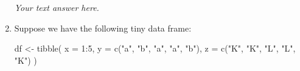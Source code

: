 \documentclass[
  letterpaper,
  DIV=11,
  numbers=noendperiod]{scrreprt}
\newenvironment{Shaded}{\begin{snugshade}}{\end{snugshade}}
\newcommand{\AttributeTok}[1]{\textcolor[rgb]{0.40,0.45,0.13}{#1}}
\newcommand{\DecValTok}[1]{\textcolor[rgb]{0.68,0.00,0.00}{#1}}
\newcommand{\FunctionTok}[1]{\textcolor[rgb]{0.28,0.35,0.67}{#1}}
\newcommand{\NormalTok}[1]{\textcolor[rgb]{0.00,0.23,0.31}{#1}}
\newcommand{\OtherTok}[1]{\textcolor[rgb]{0.00,0.23,0.31}{#1}}
\newcommand{\SpecialCharTok}[1]{\textcolor[rgb]{0.37,0.37,0.37}{#1}}
\newcommand{\StringTok}[1]{\textcolor[rgb]{0.13,0.47,0.30}{#1}}
\begin{document}
\begin{enumerate}
\begin{tcolorbox}
  \emph{Your text answer here.}

  \end{tcolorbox}
\item
  Suppose we have the following tiny data frame:

\begin{Shaded}
\begin{Highlighting}[]
\NormalTok{df }\OtherTok{\textless{}{-}} \FunctionTok{tibble}\NormalTok{(}
  \AttributeTok{x =} \DecValTok{1}\SpecialCharTok{:}\DecValTok{5}\NormalTok{,}
  \AttributeTok{y =} \FunctionTok{c}\NormalTok{(}\StringTok{"a"}\NormalTok{, }\StringTok{"b"}\NormalTok{, }\StringTok{"a"}\NormalTok{, }\StringTok{"a"}\NormalTok{, }\StringTok{"b"}\NormalTok{),}
  \AttributeTok{z =} \FunctionTok{c}\NormalTok{(}\StringTok{"K"}\NormalTok{, }\StringTok{"K"}\NormalTok{, }\StringTok{"L"}\NormalTok{, }\StringTok{"L"}\NormalTok{, }\StringTok{"K"}\NormalTok{)}
\NormalTok{)}
\end{Highlighting}
\end{Shaded}
\end{enumerate}
\end{document}
